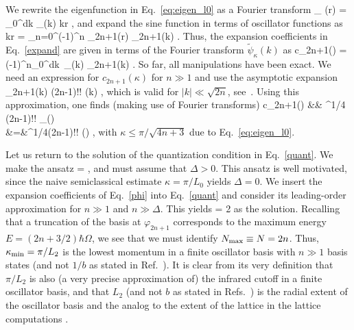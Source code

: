 	We rewrite the eigenfunction in Eq.~\eqref{eq:eigen_l0} as a Fourier transform
	\beq
	\psi_{\kappa} (r) = \sqrt{2\over \pi} \int\limits_0^\infty dk
	\tilde{\psi}_{\kappa}(k) \sin kr \; ,
	\eeq
	and expand the sine function in terms of oscillator functions as
	\beq
	\sin kr =  \sum_{n=0}^\infty (-1)^n \varphi_{2n+1}(r)
	\varphi_{2n+1}(k) \; .
	\eeq
	Thus, the expansion coefficients in Eq.~\eqref{expand} are given in
	terms of the Fourier transform $\tilde{\psi}_\kappa(k)$ as
	\beq
	\label{integ}
	c_{2n+1}(\kappa) = (-1)^n\int\limits_0^\infty dk\, \tilde{\psi}_{\kappa}(k)
	\varphi_{2n+1}(k) \; .
	\eeq
	So far, all manipulations have been exact.  We need an expression for
	$c_{2n+1}(\kappa)$ for $n\gg 1$ and use the asymptotic expansion
	\beq
	\label{approxwf}
	\varphi_{2n+1}(k) 
	{(2n-1)!!\over {}}
	\sin (k) \; ,
	\eeq
	which is valid for $|k|\ll \sqrt{2n}$, see~\cite{gradshteyn}.
	Using this approximation, one finds (making use of Fourier transforms)
	\bea
	\label{phi}
	c_{2n+1}(\kappa) &\approx& \pi^{1/4} {(2n-1)!!\over {}}
	\psi_{\kappa}() \nonumber\\
	&=&\pi^{1/4}{(2n-1)!!\over {}}
	\sin (\kappa) \; ,
	\eea
	with $\kappa \le \pi/\sqrt{4n+3}$ due to Eq.~\eqref{eq:eigen_l0}.

	Let us return to the solution of the quantization
	condition in Eq.~\eqref{quant}.  We make the ansatz
	\beq
	\kappa = {\pi\over{}} \; ,
	\eeq
	and must assume that $\Delta > 0$.  This ansatz is well motivated, since the
	naive semiclassical estimate $\kappa = \pi/L_0$ yields $\Delta=0$.  We
	insert the expansion coefficients of Eq.~\eqref{phi} into Eq.~\eqref{quant}
	and consider its leading-order approximation
	for $n\gg 1$ and $n\gg \Delta$. This yields
	\beq
	\Delta = 2
	\eeq
	as the solution. Recalling that a truncation of the basis at
	$\varphi_{2n+1}$ corresponds to the maximum energy
	$E=(2n+3/2)\hbar\Omega$, we see that we must identify
	${N_{\mathrm{max}}} \equiv N = 2n$. Thus,
	$\kappa_{\rm min} = \pi/L_2$ is the lowest momentum in a finite
	oscillator basis with $n \gg 1$ basis states (and not $1/b$ as stated in
	Ref.~\cite{Coon:2012ab}).  It is clear from its
	very definition that $\pi/L_2$ is also (a very precise approximation of)
	the infrared cutoff in a finite	oscillator basis, and that $L_2$ (and not $b$
	as stated in Refs.~\cite{Stetcu:2006ey,Stetcu:2007ms}) is the radial extent
	of the oscillator basis and the analog to the extent of the lattice in the
	lattice computations \cite{Luscher:1985dn}.

